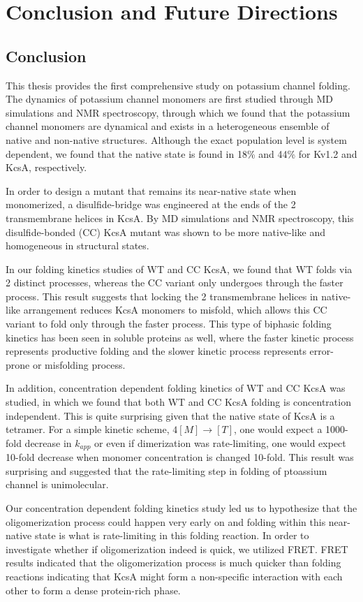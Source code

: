 \chapter{Conclusion and Future Directions}
\section{Conclusion}
This thesis provides the first comprehensive study on potassium channel folding. The dynamics of potassium channel monomers are first studied through MD simulations and NMR spectroscopy, through which we found that the potassium channel monomers are dynamical and exists in a heterogeneous ensemble of native and non-native structures. Although the exact population level is system dependent, we found that the native state is found in 18\% and 44\% for Kv1.2 and KcsA, respectively.

In order to design a mutant that remains its near-native state when monomerized, a disulfide-bridge was engineered at the ends of the 2 transmembrane helices in KcsA. By MD simulations and NMR spectroscopy, this disulfide-bonded (CC) KcsA mutant was shown to be more native-like and homogeneous in structural states.

In our folding kinetics studies of WT and CC KcsA, we found that WT folds via 2 distinct processes, whereas the CC variant only undergoes through the faster process. This result suggests that locking the 2 transmembrane helices in native-like arrangement reduces KcsA monomers to misfold, which allows this CC variant to fold only through the faster process. This type of biphasic folding kinetics has been seen in soluble proteins as well, where the faster kinetic process represents productive folding and the slower kinetic process represents error-prone or misfolding process.

In addition, concentration dependent folding kinetics of WT and CC KcsA was studied, in which we found that both WT and CC KcsA folding is concentration independent. This is quite surprising given that the native state of KcsA is a tetramer. For a simple kinetic scheme, $ 4 [M] \rightarrow [T]$, one would expect a 1000-fold decrease in $k_{app}$ or even if dimerization was rate-limiting, one would expect 10-fold decrease when monomer concentration is changed 10-fold. This result was surprising and suggested that the rate-limiting step in folding of ptoassium channel is unimolecular.

Our concentration dependent folding kinetics study led us to hypothesize that the oligomerization process could happen very early on and folding within this near-native state is what is rate-limiting in this folding reaction. In order to investigate whether if oligomerization indeed is quick, we utilized FRET. FRET results indicated that the oligomerization process is much quicker than folding reactions indicating that KcsA might form a non-specific interaction with each other to form a dense protein-rich phase.

